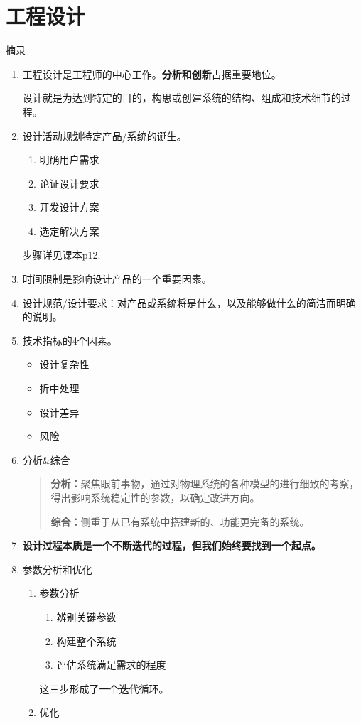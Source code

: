 \documentclass{NHNotebook}
\begin{document}
\section{工程设计}
摘录
\begin{enumerate}
    \item 工程设计是工程师的中心工作。\textbf{分析和创新}占据重要地位。
    \begin{tcolorbox}[reset]
        设计就是为达到特定的目的，构思或创建系统的结构、组成和技术细节的过程。
    \end{tcolorbox}
    \item 设计活动规划特定产品/系统的诞生。\begin{enumerate}
        \item 明确用户需求
        \item 论证设计要求
        \item 开发设计方案
        \item 选定解决方案
    \end{enumerate}步骤详见课本p12.

    \item 时间限制是影响设计产品的一个重要因素。
    \item 设计规范/设计要求：对产品或系统将是什么，以及能够做什么的简洁而明确的说明。
    \item 技术指标的4个因素。\begin{itemize}
        \item 设计复杂性
        \item 折中处理
        \item 设计差异
        \item 风险
    \end{itemize}
    \item 分析\&综合
    \begin{quote}
    \textbf{分析：}聚焦眼前事物，通过对物理系统的各种模型的进行细致的考察，得出影响系统稳定性的参数，以确定改进方向。

    \textbf{综合：}侧重于从已有系统中搭建新的、功能更完备的系统。
    \end{quote}
    \item \textbf{设计过程本质是一个不断迭代的过程，但我们始终要找到一个起点。}
    \item 参数分析和优化
    \begin{enumerate}
        \item 参数分析
        \begin{enumerate}
            \item 辨别关键参数
            \item 构建整个系统
            \item 评估系统满足需求的程度
        \end{enumerate}这三步形成了一个迭代循环。
        \item 优化
    \end{enumerate}
\end{enumerate}
\end{document}
